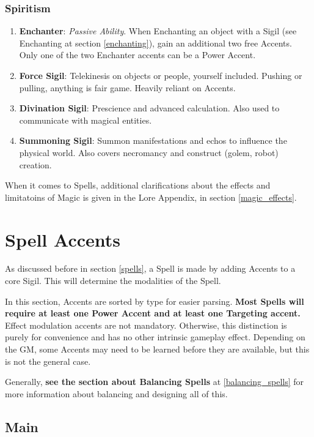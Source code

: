 \subsubsection{Spiritism}
\begin{enumerate}
    \item \textbf{Enchanter}: \textit{Passive Ability}. When Enchanting an object with a Sigil (see Enchanting at section \ref{enchanting}), gain an additional two free Accents. Only one of the two Enchanter accents can be a Power Accent.
    \item \textbf{Force Sigil}: Telekinesis on objects or people, yourself included. Pushing or pulling, anything is fair game. Heavily reliant on Accents.
    \item \textbf{Divination Sigil}: Prescience and advanced calculation. Also used to communicate with magical entities.
    \item \textbf{Summoning Sigil}: Summon manifestations and echos to influence the physical world. Also covers necromancy and construct (golem, robot) creation.
\end{enumerate}

When it comes to Spells, additional clarifications about the effects and limitatoins of Magic is given in the Lore Appendix, in section \ref{magic_effects}.


\section{Spell Accents}
\label{spell_accents}

As discussed before in section \ref{spells}, a Spell is made by adding Accents to a core Sigil. This will determine the modalities of the Spell. 

In this section, Accents are sorted by type for easier parsing. \textbf{Most Spells will require at least one Power Accent and at least one Targeting accent.} Effect modulation accents are not mandatory. Otherwise, this distinction is purely for convenience and has no other intrinsic gameplay effect. Depending on the GM, some Accents may need to be learned before they are available, but this is not the general case.

Generally, \textbf{see the section about Balancing Spells} at \ref{balancing_spells} for more information about balancing and designing all of this.

\subsection{Main}

